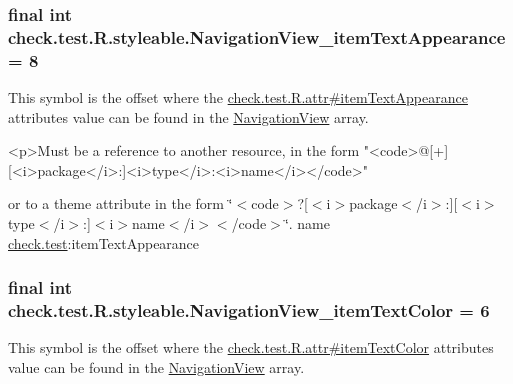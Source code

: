 \subsubsection[{Navigation\+View\+\_\+item\+Text\+Appearance}]{\setlength{\rightskip}{0pt plus 5cm}final int check.\+test.\+R.\+styleable.\+Navigation\+View\+\_\+item\+Text\+Appearance = 8\hspace{0.3cm}{\ttfamily [static]}}\label{classcheck_1_1test_1_1_r_1_1styleable_ad7564a8ef74749a8d3928c139af4eaa6}
This symbol is the offset where the \hyperlink{classcheck_1_1test_1_1_r_1_1attr_a809705d403dcd9aea9a6cb585edd2db3}{check.\+test.\+R.\+attr\#item\+Text\+Appearance} attribute\textquotesingle{}s value can be found in the \hyperlink{classcheck_1_1test_1_1_r_1_1styleable_a70ac59d722f1e4aac4b206dcf5f53107}{Navigation\+View} array.

\begin{DoxyVerb}      <p>Must be a reference to another resource, in the form "<code>@[+][<i>package</i>:]<i>type</i>:<i>name</i></code>"
\end{DoxyVerb}
 or to a theme attribute in the form \char`\"{}$<$code$>$?\mbox{[}$<$i$>$package$<$/i$>$\+:\mbox{]}\mbox{[}$<$i$>$type$<$/i$>$\+:\mbox{]}$<$i$>$name$<$/i$>$$<$/code$>$\char`\"{}.  name \hyperlink{namespacecheck_1_1test}{check.\+test}\+:item\+Text\+Appearance \hypertarget{classcheck_1_1test_1_1_r_1_1styleable_aee02dda2f676d8cbb891a1e27e386d49}{}
\subsubsection[{Navigation\+View\+\_\+item\+Text\+Color}]{\setlength{\rightskip}{0pt plus 5cm}final int check.\+test.\+R.\+styleable.\+Navigation\+View\+\_\+item\+Text\+Color = 6\hspace{0.3cm}{\ttfamily [static]}}\label{classcheck_1_1test_1_1_r_1_1styleable_aee02dda2f676d8cbb891a1e27e386d49}
This symbol is the offset where the \hyperlink{classcheck_1_1test_1_1_r_1_1attr_ae472660038cfb76060dc9b0f251d8d58}{check.\+test.\+R.\+attr\#item\+Text\+Color} attribute\textquotesingle{}s value can be found in the \hyperlink{classcheck_1_1test_1_1_r_1_1styleable_a70ac59d722f1e4aac4b206dcf5f53107}{Navigation\+View} array.


